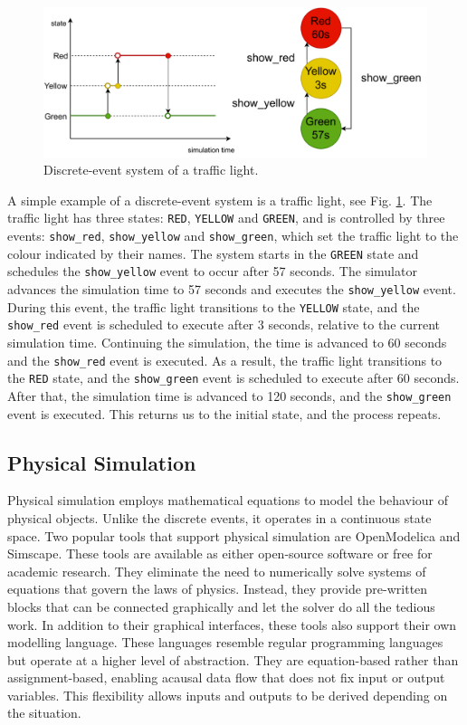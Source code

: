 \documentclass[conference]{IEEEtran}
\begin{document}
\begin{figure}[htbp]
  \centering
  \includegraphics[width=\linewidth]{images/traffic-light.drawio.pdf}
  \caption{Discrete-event system of a traffic light.}
  \label{traffic-light}
\end{figure}

A simple example of a discrete-event system is a traffic light, see Fig. \ref{traffic-light}.
The traffic light has three states: \texttt{RED}, \texttt{YELLOW} and \texttt{GREEN},
and is controlled by three events: \texttt{show\_red}, \texttt{show\_yellow} and \texttt{show\_green}, which set the traffic light to the colour indicated by their names.
The system starts in the \texttt{GREEN} state and schedules the \texttt{show\_yellow} event to occur after 57 seconds.
The simulator advances the simulation time to 57 seconds and executes the \texttt{show\_yellow} event.
During this event, the traffic light transitions to the \texttt{YELLOW} state, and the \texttt{show\_red} event is scheduled to execute after 3 seconds, relative to the current simulation time.
Continuing the simulation, the time is advanced to 60 seconds and the \texttt{show\_red} event is executed.
As a result, the traffic light transitions to the \texttt{RED} state, and the \texttt{show\_green} event is scheduled to execute after 60 seconds.
After that, the simulation time is advanced to 120 seconds, and the \texttt{show\_green} event is executed.
This returns us to the initial state, and the process repeats.

\subsection{Physical Simulation}

Physical simulation employs mathematical equations to model the behaviour of physical objects.
Unlike the discrete events, it operates in a continuous state space.
Two popular tools that support physical simulation are OpenModelica and Simscape.
These tools are available as either open-source software or free for academic research.
They eliminate the need to numerically solve systems of equations that govern the laws of physics.
Instead, they provide pre-written blocks that can be connected graphically and let the solver do all the tedious work.
In addition to their graphical interfaces, these tools also support their own modelling language. These languages resemble regular programming languages but operate at a higher level of abstraction.
They are equation-based rather than assignment-based, enabling acausal data flow that does not fix input or output variables.
This flexibility allows inputs and outputs to be derived depending on the situation.
\end{document}
